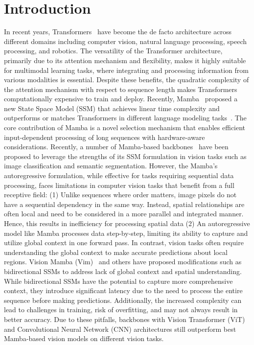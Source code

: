 \documentclass[10pt,twocolumn,letterpaper]{article}
\begin{document}
\section{Introduction}
In recent years, Transformers~\cite{vaswani2017attention} have become the de facto architecture across different domains including computer vision, natural language processing, speech processing, and robotics. The versatility of the Transformer architecture, primarily due to its attention mechanism and flexibility, makes it highly suitable for multimodal learning tasks, where integrating and processing information from various modalities is essential. Despite these benefits, the quadratic complexity of the attention mechanism with respect to sequence length makes Transformers computationally expensive to train and deploy. Recently, Mamba~\cite{gu2023mamba} proposed a new State Space Model (SSM) that achieves linear time complexity and outperforms or matches Transformers in different language modeling tasks~\cite{gu2023mamba}. The core contribution of Mamba is a novel selection mechanism that enables efficient input-dependent processing of long sequences with hardware-aware considerations. Recently, a number of Mamba-based backbones~\cite{zhu2024vision, pei2024efficientvmamba} have been proposed to leverage the strengths of its SSM formulation in vision tasks such as image classification and semantic segmentation. However, the Mamba's autoregressive formulation, while effective for tasks requiring sequential data processing, faces limitations in computer vision tasks that benefit from a full receptive field: (1) Unlike sequences where order matters, image pixels do not have a sequential dependency in the same way. Instead, spatial relationships are often local and need to be considered in a more parallel and integrated manner. Hence, this results in inefficiency for processing spatial data (2) An autoregressive model like Mamba processes data step-by-step, limiting its ability to capture and utilize global context in one forward pass. In contrast, vision tasks often require understanding the global context to make accurate predictions about local regions. Vision Mamba (Vim)~\cite{zhu2024vision} and others have proposed modifications such as bidirectional SSMs to address lack of global context and spatial understanding. While bidirectional SSMs have the potential to capture more comprehensive context, they introduce significant latency due to the need to process the entire sequence before making predictions. Additionally, the increased complexity can lead to challenges in training, risk of overfitting, and may not always result in better accuracy. Due to these pitfalls, backbones with Vision Transformer (ViT) and Convolutional Neural Network (CNN) architectures still outperform best Mamba-based vision models on different vision tasks.
\end{document}
